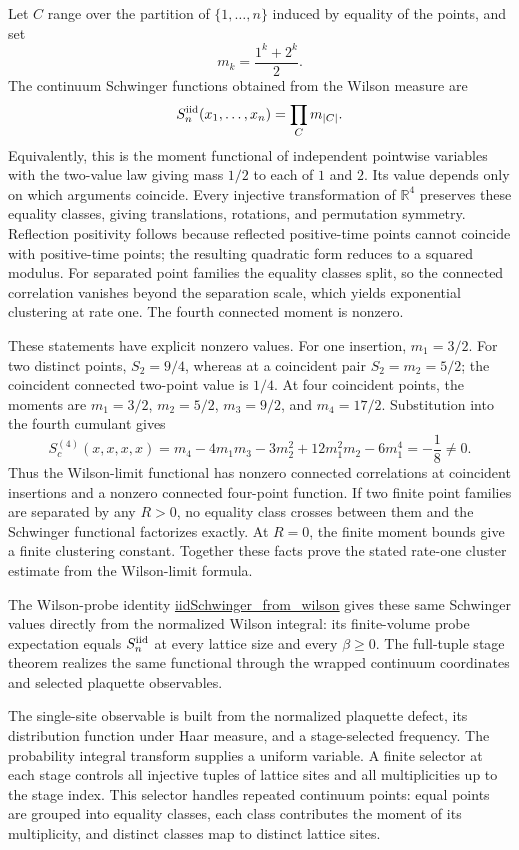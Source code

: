 \documentclass[11pt]{article}
\numberwithin{equation}{section}
\newcommand{\R}{\mathbb{R}}
\newcommand{\Lean}[1]{\url{#1}}
\begin{document}
Let \(C\) range over the partition of \(\{1,\ldots,n\}\) induced by equality of the points, and set
\[
  m_k=\frac{1^k+2^k}{2}.
\]
The continuum Schwinger functions obtained from the Wilson measure are
\[
  S_n^{\rm iid}(x_1,\ldots,x_n)=\prod_C m_{|C|}.
\]
Equivalently, this is the moment functional of independent pointwise variables with the two-value law giving mass \(1/2\) to each of \(1\) and \(2\). Its value depends only on which arguments coincide. Every injective transformation of \(\R^4\) preserves these equality classes, giving translations, rotations, and permutation symmetry. Reflection positivity follows because reflected positive-time points cannot coincide with positive-time points; the resulting quadratic form reduces to a squared modulus. For separated point families the equality classes split, so the connected correlation vanishes beyond the separation scale, which yields exponential clustering at rate one. The fourth connected moment is nonzero.

These statements have explicit nonzero values. For one insertion, \(m_1=3/2\). For two distinct points, \(S_2=9/4\), whereas at a coincident pair \(S_2=m_2=5/2\); the coincident connected two-point value is \(1/4\). At four coincident points, the moments are \(m_1=3/2\), \(m_2=5/2\), \(m_3=9/2\), and \(m_4=17/2\). Substitution into the fourth cumulant gives
\[
  S_c^{(4)}(x,x,x,x)
  =m_4-4m_1m_3-3m_2^2+12m_1^2m_2-6m_1^4
  =-\frac18\ne0.
\]
Thus the Wilson-limit functional has nonzero connected correlations at coincident insertions and a nonzero connected four-point function. If two finite point families are separated by any \(R>0\), no equality class crosses between them and the Schwinger functional factorizes exactly. At \(R=0\), the finite moment bounds give a finite clustering constant. Together these facts prove the stated rate-one cluster estimate from the Wilson-limit formula.

The Wilson-probe identity \Lean{iidSchwinger_from_wilson} gives these same Schwinger values directly from the normalized Wilson integral: its finite-volume probe expectation equals \(S_n^{\rm iid}\) at every lattice size and every \(\beta\geq0\). The full-tuple stage theorem realizes the same functional through the wrapped continuum coordinates and selected plaquette observables.

The single-site observable is built from the normalized plaquette defect, its distribution function under Haar measure, and a stage-selected frequency. The probability integral transform supplies a uniform variable. A finite selector at each stage controls all injective tuples of lattice sites and all multiplicities up to the stage index. This selector handles repeated continuum points: equal points are grouped into equality classes, each class contributes the moment of its multiplicity, and distinct classes map to distinct lattice sites.
\end{document}
